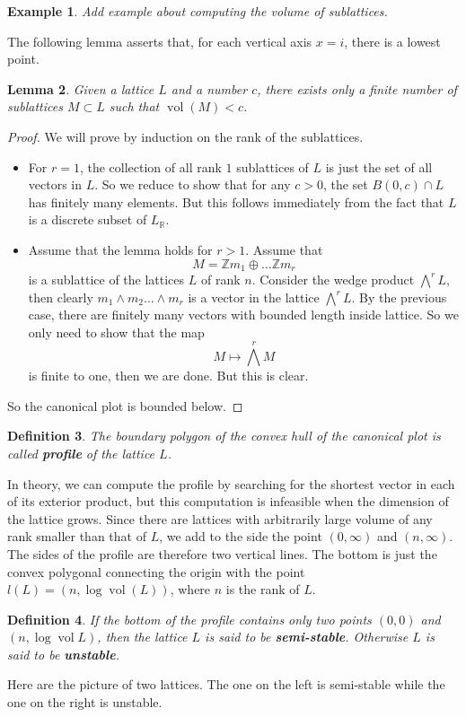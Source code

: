 \documentclass[12pt]{article} %
\newtheorem{definition}{Definition}[section]
\newtheorem{lemma}[definition]{Lemma}
\newtheorem{example}[definition]{Example}
\DeclareMathOperator{\vol}{vol}
\begin{document}
\begin{example}
    Add example about computing the volume of sublattices.
\end{example}
The following lemma asserts that, for each vertical axis $x =i$, there is a lowest point.
\begin{lemma}
    Given a lattice $L$ and a number $c$, there exists only a finite number of sublattices $M \subset L$ such that
    $\vol(M)<c$.
\end{lemma}
\begin{proof}
    We will prove by induction on the rank of the sublattices.
    \begin{itemize}
        \item For $r =1$, the collection of all rank $1$ sublattices of $L$ is just the set of all vectors in $L$. So we reduce
              to show that for any $c>0$, the set $B(0,c) \cap L$  has finitely many elements. But this follows immediately from the fact that
              $L$ is a discrete subset of $L_\mathbb{R}$.
        \item Assume that the lemma holds for $r >1$. Assume that
              \[M = \mathbb{Z}m_1\oplus \ldots \mathbb{Z}m_r\]
              is a sublattice of the lattices $L$ of rank $n$. Consider the wedge product $\bigwedge^r L$, then clearly
              $m_1\wedge m_2\ldots \wedge m_r$ is a vector in the lattice  $\bigwedge^r L$.
              By the previous case, there are finitely
              many vectors with bounded length inside lattice. So we only need to show that the map
              \[ M \mapsto \bigwedge^r M \]
              is finite to one, then we are done. But this is clear.
    \end{itemize}
    So the canonical plot is bounded below.
\end{proof}
\begin{definition}
    The boundary polygon of the convex hull of the canonical plot is called \textbf{profile} of the lattice $L$.
\end{definition}
In theory, we can compute the profile by searching for the shortest vector in each of its exterior product, but this computation
is infeasible when the dimension of the lattice grows. Since there are lattices with
arbitrarily large volume of any rank smaller than that of $L$, we add to the side the point $(0,\infty)$ and $(n,\infty)$. The sides
of the profile are therefore two vertical lines. The bottom is just the convex polygonal connecting the origin with the point
$l(L) = (n,\log\vol(L))$, where $n$ is the rank of $L$.
\begin{definition}\label{ss1}
    If the bottom of the profile contains only two points $(0,0)$ and $(n,\log\vol L)$, then the
    lattice $L$ is said to be \textbf{semi-stable}. Otherwise $L$ is said to be \textbf{unstable}.
\end{definition}
Here are the picture of two lattices. The one on the left is semi-stable while the one on the right is unstable.
\end{document}
